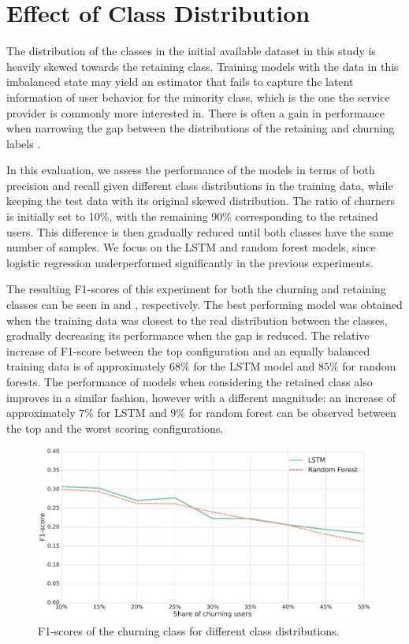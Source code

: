\documentclass{kththesis}
\begin{document}
\section{Effect of Class Distribution}
\label{sec:exp_class_dist}

The distribution of the classes in the initial available dataset in this study is heavily skewed towards the retaining class. Training models with the data in this imbalanced state may yield an estimator that fails to capture the latent information of user behavior for the minority class, which is the one the service provider is commonly more interested in. There is often a gain in performance when narrowing the gap between the distributions of the retaining and churning labels \cite{Burez2009}. 

In this evaluation, we assess the performance of the models in terms of both precision and recall given different class distributions in the training data, while keeping the test data with its original skewed distribution. The ratio of churners is initially set to 10\%, with the remaining 90\% corresponding to the retained users. This difference is then gradually reduced until both classes have the same number of samples. We focus on the LSTM and random forest models, since logistic regression underperformed significantly in the previous experiments.

The resulting F1-scores of this experiment for both the churning and retaining classes can be seen in  and , respectively. The best performing model was obtained when the training data was closest to the real distribution between the classes, gradually decreasing its performance when the gap is reduced. The relative increase of F1-score between the top configuration and an equally balanced training data is of approximately $68\%$ for the LSTM model and $85\%$ for random forests. The performance of models when considering the retained class also improves in a similar fashion, however with a different magnitude: an increase of approximately $7\%$ for LSTM and $9\%$ for random forest can be observed between the top and the worst scoring configurations.

\begin{figure}[H]
    \centering
    \includegraphics[width=1.0\textwidth,keepaspectratio]{figures/line_class_balance.pdf}
    \caption{F1-scores of the churning class for different class distributions.}
    \label{fig:line_class_balance}
\end{figure}
\end{document}
